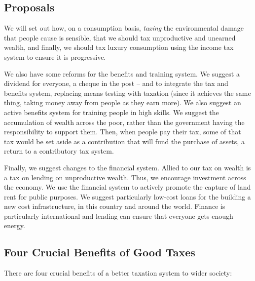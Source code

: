 \documentclass[]{tufte-handout}
\begin{document}
\hypertarget{proposals}{%
\subsection{\texorpdfstring{\textbf{Proposals}}{Proposals}}\label{proposals}}

We will set out how, on a consumption basis, \emph{taxing} the
environmental damage that people cause is sensible, that we should tax
unproductive and unearned wealth, and finally, we should tax luxury
consumption using the income tax system to ensure it is progressive.

We also have some reforms for the benefits and training system. We
suggest a dividend for everyone, a cheque in the post -- and to
integrate the tax and benefits system, replacing means testing with
taxation (since it achieves the same thing, taking money away from
people as they earn more). We also suggest an active benefits system for
training people in high skills. We suggest the accumulation of wealth
across the poor, rather than the government having the responsibility to
support them. Then, when people pay their tax, some of that tax would be
set aside as a contribution that will fund the purchase of assets, a
return to a contributory tax system.

Finally, we suggest changes to the financial system. Allied to our tax
on wealth is a tax on lending on unproductive wealth. Thus, we encourage
investment across the economy. We use the financial system to actively
promote the capture of land rent for public purposes. We suggest
particularly low-cost loans for the building a new cost infrastructure,
in this country and around the world. Finance is particularly
international and lending can ensure that everyone gets enough energy.

\hypertarget{four-crucial-benefits-of-good-taxes}{%
\subsection{\texorpdfstring{\textbf{Four Crucial Benefits of Good
Taxes}}{Four Crucial Benefits of Good Taxes}}\label{four-crucial-benefits-of-good-taxes}}

There are four crucial benefits of a better taxation system to wider
society:
\end{document}

